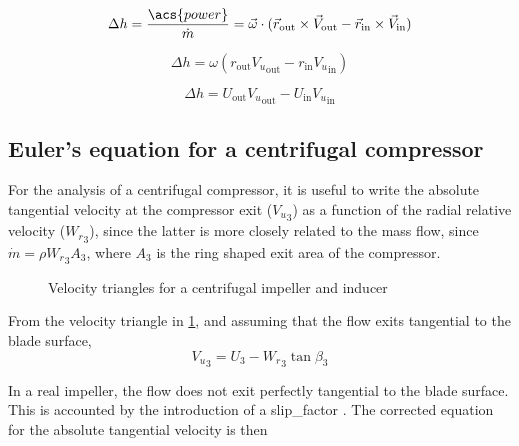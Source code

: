 \documentclass[tcc]{subfiles}
\begin{document}
\begin{equation}
    \Delta h = \frac{\acs{power}}{\dot{m}} 
             = \vec{\omega} \cdot (\vec{r}_{\text{out}}\cross\vec{V}_{\text{out}} - \vec{r}_{\text{in}}\cross\vec{V}_{\text{in}}) 
\end{equation}

\begin{equation}
    \Delta h = \omega (r_{\text{out}} {V_u}_{\text{out}} - r_{\text{in}} {V_u}_{\text{in}}) 
\end{equation}

\begin{equation}
    \label{eqn:euler}
    \Delta h = U_{\text{out}} {V_u}_{\text{out}} - U_{\text{in}} {V_u}_{\text{in}} 
\end{equation}

\subsection{Euler's equation for a centrifugal compressor}

For the analysis of a centrifugal compressor, 
it is useful to write the absolute tangential velocity at the compressor exit (${V_u}_3$)
as a function of the radial relative velocity (${W_r}_3$),
since the latter is more closely related to the mass flow, 
since $\dot{m} = \rho {W_r}_3 A_3$, where $A_3$ is the ring shaped exit area of the compressor.

\begin{figure}
    \centering\sffamily\small
    \caption{Velocity triangles for a centrifugal impeller and inducer}
    \label{fig:compressor_schematic}
    
    \source{\authorsfigure}
\end{figure}

From the velocity triangle in \cref{fig:compressor_schematic}, 
and assuming that the flow exits tangential to the blade surface,
\begin{equation}
    \label{eqn:V_u_3}
    {V_u}_3 = U_3 - {W_r}_3 \tan\beta_3
\end{equation}

In a real impeller, the flow does not exit perfectly tangential to the blade surface. 
This is accounted by the introduction of a \acf{slip_factor} \cite{Wiesner1967,Aungier1995}.
The corrected equation for the absolute tangential velocity is then
\end{document}
